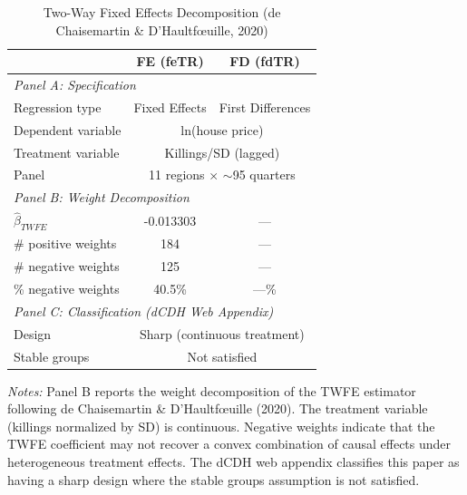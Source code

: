 \begin{table}[htbp]
\centering
\caption{Two-Way Fixed Effects Decomposition (de Chaisemartin \& D'Haultf\oe uille, 2020)}
\label{tab:besley_twfe}
\begin{tabular}{lcc}
\toprule
 & FE (feTR) & FD (fdTR) \\
\midrule
\multicolumn{3}{l}{\textit{Panel A: Specification}} \\[3pt]
Regression type & Fixed Effects & First Differences \\
Dependent variable & \multicolumn{2}{c}{ln(house price)} \\
Treatment variable & \multicolumn{2}{c}{Killings/SD (lagged)} \\
Panel & \multicolumn{2}{c}{11 regions $\times$ $\sim$95 quarters} \\[6pt]
\multicolumn{3}{l}{\textit{Panel B: Weight Decomposition}} \\[3pt]
$\hat{\beta}_{TWFE}$ & -0.013303 & --- \\
\# positive weights & 184 & --- \\
\# negative weights & 125 & --- \\
\% negative weights &  40.5\% & ---\% \\[6pt]
\multicolumn{3}{l}{\textit{Panel C: Classification (dCDH Web Appendix)}} \\[3pt]
Design & \multicolumn{2}{c}{Sharp (continuous treatment)} \\
Stable groups & \multicolumn{2}{c}{Not satisfied} \\
\bottomrule
\end{tabular}

\vspace{6pt}
\begin{minipage}{0.92\textwidth}
\footnotesize
\textit{Notes:} Panel B reports the weight decomposition of the TWFE estimator 
following de Chaisemartin \& D'Haultf\oe uille (2020). 
The treatment variable (killings normalized by SD) is continuous. 
Negative weights indicate that the TWFE coefficient may not recover 
a convex combination of causal effects under heterogeneous treatment effects. 
The dCDH web appendix classifies this paper as having a sharp design 
where the stable groups assumption is not satisfied.
\end{minipage}
\end{table}
